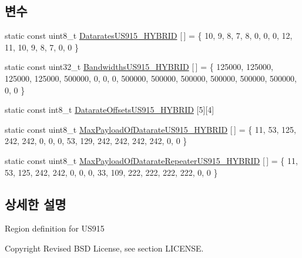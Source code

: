 \subsection*{변수}
\begin{DoxyCompactItemize}
\item 
static const uint8\+\_\+t \mbox{\hyperlink{group___r_e_g_i_o_n_u_s915_h_y_b_ga72c443cba5429b7ee2bff33f70fc8aec}{Datarates\+U\+S915\+\_\+\+H\+Y\+B\+R\+ID}} \mbox{[}$\,$\mbox{]} = \{ 10, 9, 8, 7, 8, 0, 0, 0, 12, 11, 10, 9, 8, 7, 0, 0 \}
\item 
static const uint32\+\_\+t \mbox{\hyperlink{group___r_e_g_i_o_n_u_s915_h_y_b_gada3976d142cb9c990e9af2567ff8ecca}{Bandwidths\+U\+S915\+\_\+\+H\+Y\+B\+R\+ID}} \mbox{[}$\,$\mbox{]} = \{ 125000, 125000, 125000, 125000, 500000, 0, 0, 0, 500000, 500000, 500000, 500000, 500000, 500000, 0, 0 \}
\item 
static const int8\+\_\+t \mbox{\hyperlink{group___r_e_g_i_o_n_u_s915_h_y_b_ga5a529866ea886b5f171f6c49fb7fdbcd}{Datarate\+Offsets\+U\+S915\+\_\+\+H\+Y\+B\+R\+ID}} \mbox{[}5\mbox{]}\mbox{[}4\mbox{]}
\item 
static const uint8\+\_\+t \mbox{\hyperlink{group___r_e_g_i_o_n_u_s915_h_y_b_ga0165d0e904aef148daa7b87353f58aca}{Max\+Payload\+Of\+Datarate\+U\+S915\+\_\+\+H\+Y\+B\+R\+ID}} \mbox{[}$\,$\mbox{]} = \{ 11, 53, 125, 242, 242, 0, 0, 0, 53, 129, 242, 242, 242, 242, 0, 0 \}
\item 
static const uint8\+\_\+t \mbox{\hyperlink{group___r_e_g_i_o_n_u_s915_h_y_b_ga57e0d330c0e1458e1523d826e1874b7a}{Max\+Payload\+Of\+Datarate\+Repeater\+U\+S915\+\_\+\+H\+Y\+B\+R\+ID}} \mbox{[}$\,$\mbox{]} = \{ 11, 53, 125, 242, 242, 0, 0, 0, 33, 109, 222, 222, 222, 222, 0, 0 \}
\end{DoxyCompactItemize}


\subsection{상세한 설명}
Region definition for U\+S915 

\begin{DoxyCopyright}{Copyright}
Revised B\+SD License, see section L\+I\+C\+E\+N\+SE.
\end{DoxyCopyright}


